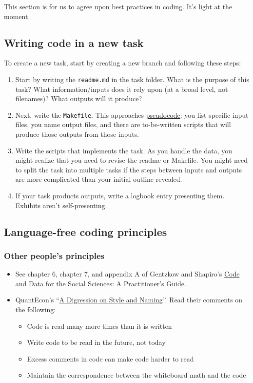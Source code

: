 This section is for us to agree upon best practices in coding.
It's light at the moment.

\subsection{Writing code in a new task}

To create a new task, start by creating a new branch and following these steps:
\begin{enumerate}
\item
Start by writing the \texttt{readme.md} in the task folder.
What is the purpose of this task?
What information/inputs does it rely upon (at a broad level, not filenames)?
What outputs will it produce?
\item
Next, write the \texttt{Makefile}.
This approaches \href{https://en.wikipedia.org/wiki/Pseudocode}{pseudocode}: you list specific input files, you name output files, and there are to-be-written scripts that will produce those outputs from those inputs.
\item
Write the scripts that implements the task.
As you handle the data, you might realize that you need to revise the readme or Makefile.
You might need to split the task into multiple tasks if the steps between inputs and outputs are more complicated than your initial outline revealed.
\item
If your task products outputs, write a logbook entry presenting them.
Exhibits aren't self-presenting.
\end{enumerate}

\subsection{Language-free coding principles}

\subsubsection{Other people's principles}

\begin{itemize}
	\item See chapter 6, chapter 7, and appendix A of Gentzkow and Shapiro's \href{https://web.stanford.edu/~gentzkow/research/CodeAndData.pdf}{Code and Data for the Social Sciences: A Practitioner’s Guide}.
	\item QuantEcon's ``\href{https://julia.quantecon.org/getting_started_julia/introduction_to_types.html#A-Digression-on-Style-and-Naming}{A Digression on Style and Naming}''. Read their comments on the following:
	\begin{itemize}
	\item Code is read many more times than it is written
	\item Write code to be read in the future, not today
	\item Excess comments in code can make code harder to read
	\item Maintain the correspondence between the whiteboard math and the code
	\end{itemize}
\end{itemize}

